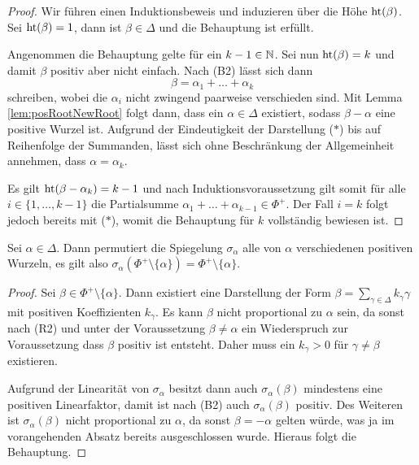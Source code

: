 \begin{proof}
  Wir führen einen Induktionsbeweis und induzieren über die Höhe $\operatorname{ht}(\beta)$.
  Sei $\operatorname{ht}(\beta) = 1$, dann ist $\beta \in \Delta$ und die Behauptung ist erfüllt.

  Angenommen die Behauptung gelte für ein $k-1 \in \mathbb{N}$.
  Sei nun $\operatorname{ht}(\beta) = k$ und damit $\beta$ positiv aber nicht einfach.
  Nach (B2) lässt sich dann 
  \begin{displaymath}
    \beta = \alpha_1 + \dots + \alpha_k \tag{$\ast$}
  \end{displaymath}
  schreiben, wobei die $\alpha_i$ nicht zwingend paarweise verschieden sind.
  Mit Lemma \ref{lem:posRootNewRoot} folgt dann, dass ein $\alpha \in \Delta$ existiert, sodass $\beta - \alpha$ eine positive Wurzel ist.
  Aufgrund der Eindeutigkeit der Darstellung ($\ast$) bis auf Reihenfolge der Summanden, lässt sich ohne Beschränkung der Allgemeinheit annehmen, dass $\alpha = \alpha_k$.

  Es gilt $\operatorname{ht}(\beta - \alpha_{k}) = k - 1$ und nach Induktionsvoraussetzung gilt 
  somit für alle $i \in \{1,\dots,k-1\}$ die Partialsumme $\alpha_1 + \dots + \alpha_{k-1} \in \Phi^+$.
  Der Fall $i = k$ folgt jedoch bereits mit ($\ast$), womit die Behauptung für $k$ vollständig bewiesen ist.
\end{proof}

\begin{lem}
  \label{lem:permute}
  Sei $\alpha \in \Delta$. 
  Dann permutiert die Spiegelung $\sigma_\alpha$ alle von $\alpha$ verschiedenen positiven Wurzeln, es gilt also $\sigma_\alpha(\Phi^+ \setminus \{\alpha\}) = \Phi^+ \setminus \{\alpha\}$.
\end{lem}

\begin{proof}
  Sei $\beta \in \Phi^+ \setminus \{\alpha\}$. 
  Dann existiert eine Darstellung der Form $\beta = \sum_{\gamma \in \Delta} k_\gamma \gamma$ mit positiven Koeffizienten $k_\gamma$.
  Es kann $\beta$ nicht proportional zu $\alpha$ sein, da sonst nach (R2) und unter der Voraussetzung $\beta \neq \alpha$ ein Wiederspruch zur Voraussetzung dass $\beta$ positiv ist entsteht.
  Daher muss ein $k_\gamma > 0$ für $\gamma \neq \beta$ existieren.

  Aufgrund der Linearität von $\sigma_\alpha$ besitzt dann auch $\sigma_\alpha(\beta)$ mindestens eine positiven Linearfaktor, damit ist nach (B2) auch $\sigma_\alpha(\beta)$ positiv.
  Des Weiteren ist $\sigma_\alpha(\beta)$ nicht proportional zu $\alpha$, da sonst $\beta = -\alpha$ gelten würde, was ja im vorangehenden Absatz bereits ausgeschlossen wurde.
  Hieraus folgt die Behauptung.
\end{proof}


